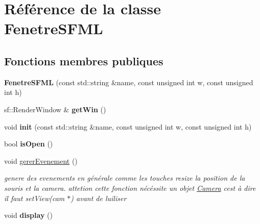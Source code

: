 \hypertarget{class_fenetre_s_f_m_l}{}\section{Référence de la classe Fenetre\+S\+F\+ML}
\label{class_fenetre_s_f_m_l}
\subsection*{Fonctions membres publiques}
\begin{DoxyCompactItemize}
\item 
\mbox{\label{class_fenetre_s_f_m_l_a8b5a5cd1fd63188803cddc7e038a47bf}} 
{\bfseries Fenetre\+S\+F\+ML} (const std\+::string \&name, const unsigned int w, const unsigned int h)
\item 
\mbox{\label{class_fenetre_s_f_m_l_a878c1c121f8c2397e74ab91f76e65798}} 
sf\+::\+Render\+Window \& {\bfseries get\+Win} ()
\item 
\mbox{\label{class_fenetre_s_f_m_l_a2b7a011157a5ed20be831b8d6dcdb827}} 
void {\bfseries init} (const std\+::string \&name, const unsigned int w, const unsigned int h)
\item 
\mbox{\label{class_fenetre_s_f_m_l_a4d63d531ea7b3bec984c9d1d61867d26}} 
bool {\bfseries is\+Open} ()
\item 
\mbox{\label{class_fenetre_s_f_m_l_a72f58aaf9ed9fd5a864594974bb135c4}} 
void \mbox{\hyperlink{class_fenetre_s_f_m_l_a72f58aaf9ed9fd5a864594974bb135c4}{gerer\+Evenement}} ()
\begin{DoxyCompactList}\small\item\em genere des evenements en générale comme les touches resize la position de la souris et la camera. attetion cette fonction nécéssite un objet \mbox{\hyperlink{class_camera}{Camera}} c\textquotesingle{}est à dire il faut set\+View(cam $\ast$) avant de l\textquotesingle{}uiliser \end{DoxyCompactList}\item 
\mbox{\label{class_fenetre_s_f_m_l_ae2e35f684a7ae5d78aa47f5e9dfc1729}} 
void {\bfseries display} ()
\item 

\end{DoxyCompactItemize}
